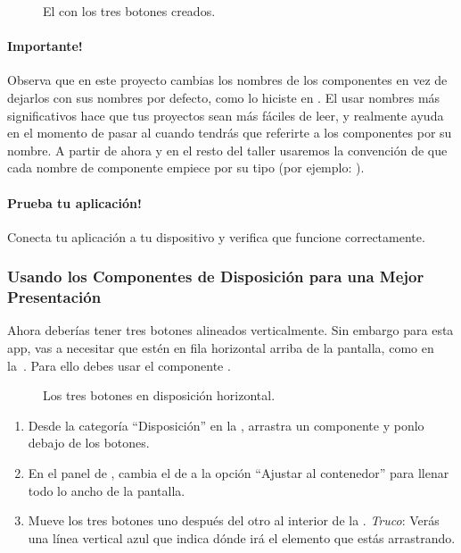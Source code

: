\begin{figure}[H]
\centering
\caption{El \viewer con los tres botones creados.}
\label{fig:paintPot1}
\end{figure}

\paragraph{Importante!}
Observa que en este proyecto cambias los nombres de los componentes en
vez de dejarlos con sus nombres por defecto, como lo hiciste en
. El usar nombres más significativos hace que tus
proyectos sean más fáciles de leer, y realmente ayuda en el momento de
pasar al \blockEditor cuando tendrás que referirte a los componentes
por su nombre. A partir de ahora y en el resto del taller usaremos la
convención de que cada nombre de componente empiece por su tipo (por
ejemplo: ).

\paragraph{Prueba tu aplicación!} Conecta tu aplicación a tu
dispositivo y verifica que funcione correctamente.

\subsubsection*{Usando los Componentes de Disposición para una Mejor
  Presentación}

Ahora deberías tener tres botones alineados verticalmente. Sin embargo
para esta app, vas a necesitar que estén en fila horizontal arriba de
la pantalla, como en la~. Para ello debes usar el
componente .

\begin{figure}[H]
\centering
\caption{Los tres botones en disposición horizontal.}
\label{fig:paintPot2}
\end{figure}

\begin{enumerate}

\item Desde la categoría “Disposición'' en la \palette, arrastra un
  componente  y ponlo debajo de los
  botones.

\item En el panel de \properties, cambia el  de
   a la opción ``Ajustar al
  contenedor'' para llenar todo lo ancho de la pantalla.

\item Mueve los tres botones uno después del otro al interior de la
  . \emph{Truco}: Verás una línea
  vertical azul que indica dónde irá el elemento que estás
  arrastrando.

\end{enumerate}


